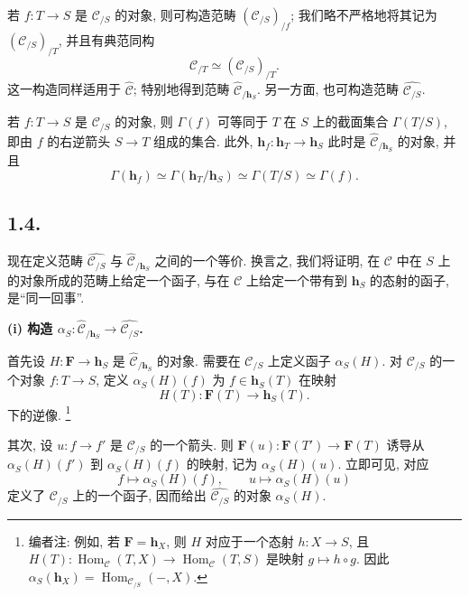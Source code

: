 若 \(f:T\to S\) 是 \(\mathscr C_{/S}\) 的对象, 则可构造范畴
\((\mathscr C_{/S})_{/f}\); 我们略不严格地将其记为
\((\mathscr C_{/S})_{/T}\), 并且有典范同构
\[
  \mathscr C_{/T}\simeq(\mathscr C_{/S})_{/T}.
\]
这一构造同样适用于 \(\widehat{\mathscr C}\); 特别地得到范畴
\(\widehat{\mathscr C}_{/\mathbf h_S}\).
另一方面, 也可构造范畴 \(\widehat{\mathscr C_{/S}}\).

若 \(f:T\to S\) 是 \(\mathscr C_{/S}\) 的对象, 则 \(\Gamma(f)\) 可等同于
\(T\) 在 \(S\) 上的截面集合 \(\Gamma(T/S)\), 即由 \(f\) 的右逆箭头
\(S\to T\) 组成的集合. 此外, \(\mathbf h_f:\mathbf h_T\to\mathbf h_S\)
此时是 \(\widehat{\mathscr C}_{/\mathbf h_S}\) 的对象, 并且
\[
  \Gamma(\mathbf h_f)
    \simeq\Gamma(\mathbf h_T/\mathbf h_S)
    \simeq\Gamma(T/S)
    \simeq\Gamma(f).
\]

\subsection*{1.4.}

现在定义范畴 \(\widehat{\mathscr C_{/S}}\) 与
\(\widehat{\mathscr C}_{/\mathbf h_S}\) 之间的一个等价.
换言之, 我们将证明, 在 \(\mathscr C\) 中在 \(S\) 上的对象所成的范畴上给定一个函子,
与在 \(\mathscr C\) 上给定一个带有到 \(\mathbf h_S\) 的态射的函子, 是“同一回事”.

\medskip
\noindent\textbf{(i) 构造
\(\alpha_S:\widehat{\mathscr C}_{/\mathbf h_S}
\to\widehat{\mathscr C_{/S}}\).}

首先设 \(H:\mathbf F\to\mathbf h_S\) 是
\(\widehat{\mathscr C}_{/\mathbf h_S}\) 的对象.
需要在 \(\mathscr C_{/S}\) 上定义函子 \(\alpha_S(H)\).
对 \(\mathscr C_{/S}\) 的一个对象 \(f:T\to S\),
定义 \(\alpha_S(H)(f)\) 为 \(f\in\mathbf h_S(T)\) 在映射
\[
  H(T):\mathbf F(T)\longrightarrow\mathbf h_S(T).
\]
下的逆像.
\footnote{编者注: 例如, 若 \(\mathbf F=\mathbf h_X\),
则 \(H\) 对应于一个态射 \(h:X\to S\), 且
\(H(T):\operatorname{Hom}_{\mathscr C}(T,X)\to
\operatorname{Hom}_{\mathscr C}(T,S)\) 是映射 \(g\mapsto h\circ g\).
因此 \(\alpha_S(\mathbf h_X)=\operatorname{Hom}_{\mathscr C_{/S}}(-,X)\).}

其次, 设 \(u:f\to f'\) 是 \(\mathscr C_{/S}\) 的一个箭头.
则 \(\mathbf F(u):\mathbf F(T')\to\mathbf F(T)\) 诱导从
\(\alpha_S(H)(f')\) 到 \(\alpha_S(H)(f)\) 的映射, 记为 \(\alpha_S(H)(u)\).
立即可见, 对应
\[
  f\longmapsto\alpha_S(H)(f),
  \qquad
  u\longmapsto\alpha_S(H)(u)
\]
定义了 \(\mathscr C_{/S}\) 上的一个函子, 因而给出
\(\widehat{\mathscr C_{/S}}\) 的对象 \(\alpha_S(H)\).

